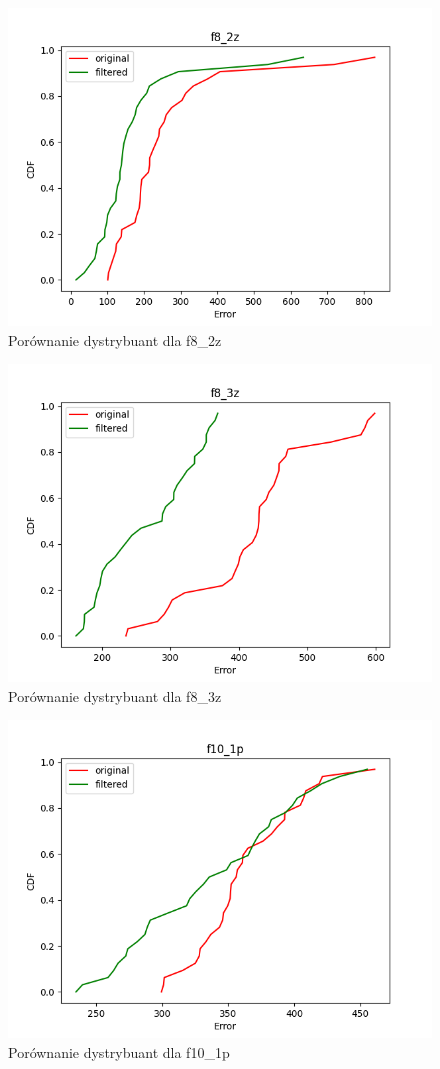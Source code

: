 \documentclass{classrep}
\begin{document}
{\begin{figure}[!htbp]
            \centering
            \includegraphics[width=\textwidth, width=90mm]{comparison_f8_2z.png}
            \caption{Porównanie dystrybuant dla f8\_2z}
            \label{comparison_f8_2z}
    \end{figure}

\begin{figure}[!htbp]
            \centering
            \includegraphics[width=\textwidth, width=90mm]{comparison_f8_3z.png}
            \caption{Porównanie dystrybuant dla f8\_3z}
            \label{comparison_f8_3z}
    \end{figure}

\begin{figure}[!htbp]
            \centering
            \includegraphics[width=\textwidth, width=90mm]{comparison_f10_1p.png}
            \caption{Porównanie dystrybuant dla f10\_1p}
            \label{comparison_f10_1p}
    \end{figure}

}
\end{document}
